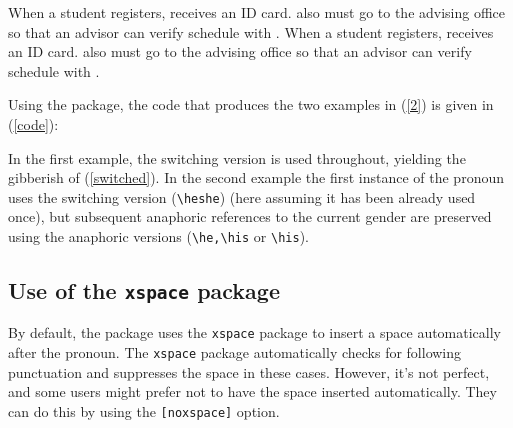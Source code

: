 \documentclass[11pt]{article}
\newcommand*\bs{\textbackslash}
\newcommand*{\pkg}[1]{\texttt{#1}\xspace}
\begin{document}
\begin{exe}
\ex\label{2}
\begin{xlist}
\ex \hefalse When a student registers, \heshe receives an ID card. \Heshe also must go to the advising office so that an advisor can  verify \hisher schedule with \himher.\label{switched}
\ex When a student registers, \heshe receives an ID card. \He also must go to the advising office so that an advisor  can verify \his schedule with \him.\label{anaphoric}
\end{xlist}
\end{exe}

Using the package, the code that produces the two examples in (\ref{2}) is given in (\ref{code}):

\begin{exe}
\ex\label{code}
\end{exe}

In the first example, the switching version is used throughout, yielding the gibberish of (\ref{switched}). In the second example the first instance of the pronoun uses the switching version (\pkg{\bs heshe}) (here assuming it has been already used once), but subsequent anaphoric references to the current gender are preserved using the anaphoric versions (\pkg{\bs he,\bs his} or \pkg{\bs his}).

\subsection{Use of the \pkg{xspace} package}
By default, the package uses the \pkg{xspace} package to insert a space automatically after the pronoun. The \pkg{xspace} package automatically checks for following punctuation and suppresses the space in these cases.  However, it's not perfect, and some users might prefer not to have the space inserted automatically.  They can do this by using the \pkg{[noxspace]} option.
\end{document}
